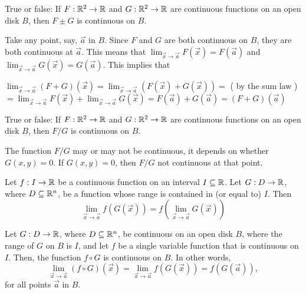 \documentclass{ximera}
\begin{document}
\begin{question}
  True or false: If $F:\mathbb R^2\to\mathbb R$ and $G:\mathbb R^2\to\mathbb R$ are continuous
  functions on an open disk $B$, then $F\pm G$ is continuous on $B$.
  \begin{prompt}
    \begin{multipleChoice}
  \end{multipleChoice}
  \end{prompt}
\end{question}
\begin{explanation}
Take any point, say, $\vec{a}$ in $B$. Since $F$ and $G$ are both continuous on $B$, they are both continuous at $\vec{a}$.
This means that $\lim_{\vec{x}\to\vec{a}} F(\vec{x}) = F(\vec{a})$ and $\lim_{\vec{x}\to\vec{a}} G(\vec{x}) = G(\vec{a})$.
This implies that

 $\lim_{\vec{x}\to\vec{a}} (F+G)(\vec{x})=\lim_{\vec{x}\to\vec{a}} (F(\vec{x})+G(\vec{x}))= $ (\textrm{  by the sum law })\\
 $=\lim_{\vec{x}\to\vec{a}} F(\vec{x})+\lim_{\vec{x}\to\vec{a}} G(\vec{x})= F(\vec{a})+G(\vec{a})=(F+G)(\vec{a})$

\end{explanation}
\begin{question}
  True or false: If $F:\mathbb R^2\to\mathbb R$ and $G:\mathbb R^2\to\mathbb R$ are continuous
  functions on an open disk $B$, then $F/G$ is continuous on $B$.
  \begin{prompt}
    \begin{multipleChoice}
    \end{multipleChoice}
    \begin{feedback}
      The function $F/G$ may or may not be continuous, it depends on
      whether $G(x,y)=0$. If $G(x,y)=0$, then $F/G$ not continuous at that point.
    \end{feedback}
  \end{prompt}
\end{question}

\begin{theorem}
  Let $f:I\to\mathbb R$ be a continuous function on an interval $I\subseteq\mathbb R$. Let
  $G:D\to \mathbb R$, where $D\subseteq\mathbb R^n$,  be a function whose range is contained in (or equal
  to) $I$. Then
  \[
  \lim_{\vec{x}\to\vec{a}} f( G(\vec{x})) = f(\lim_{\vec{x}\to\vec{a}}G(\vec{x}))
  \]
\end{theorem}

\begin{corollary}
  Let $G:D\to \mathbb R$, where $D\subseteq\mathbb R^n$, be continuous on an open disk $B$, where the
  range of $G$ on $B$ is $I$, and let $f$ be a single variable
  function that is continuous on $I$. Then, the function $f\circ G$ is continuous on $B$.
  In other words,
  \[
 \lim_{\vec{x}\to\vec{a}} (f\circ G)(\vec{x}) =\lim_{\vec{x}\to\vec{a}}f(G(\vec{x}))=f(G(\vec{a})),
  \]
  for all points $\vec{a}$ in $B$.
\end{corollary}
\end{document}

